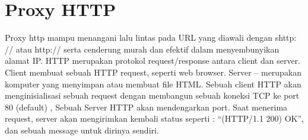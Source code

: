 \section{Proxy HTTP}
Proxy http mampu menangani lalu lintas pada URL yang diawali dengan shttp: // atau http:// serta cenderung murah dan efektif dalam menyembunyikan alamat IP. HTTP merupakan protokol request/response antara client dan server. Client membuat sebuah HTTP request, seperti web browser. Server – merupakan komputer yang menyimpan atau membuat file HTML. Sebuah client HTTP akan menginisialisasi sebuah request dengan membangun sebuah koneksi TCP ke port 80 (default) , Sebuah Server HTTP akan mendengarkan port. Saat menerima request, server akan mengirimkan kembali status seperti : “(HTTP/1.1 200) OK”, dan sebuah message untuk dirinya sendiri\cite{farhanah2011pengembangan}.